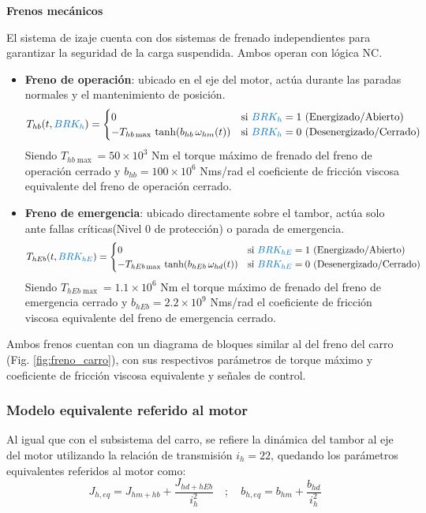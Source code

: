 \documentclass{article}
\begin{document}
\vspace{0.3cm}
\noindent\textbf{Frenos mecánicos}

El sistema de izaje cuenta con dos sistemas de frenado independientes para garantizar la seguridad de la
carga suspendida. Ambos operan con lógica NC.
\begin{itemize}
\item \textbf{Freno de operación}: ubicado en el eje del motor, actúa durante las paradas normales y el mantenimiento de posición. 
\begin{equation}
    T_{hb}(t,\textcolor{signalcolor}{BRK_{h}}) = 
    \begin{cases} 
        0 & \text{si } \textcolor{signalcolor}{BRK_h} = 1 \text{ (Energizado/Abierto)} \\
        -T_{hb\max} \, \tanh(b_{hb} \, \omega_{hm}(t)) & \text{si } \textcolor{signalcolor}{BRK_h} = 0 \text{ (Desenergizado/Cerrado)}
    \end{cases}
\end{equation}
Siendo $T_{hb\max} = 50 \times 10^3$ Nm el torque máximo de frenado del freno de operación cerrado y $b_{hb} = 100 \times 10^6$ Nms/rad el coeficiente de fricción viscosa equivalente del freno de operación cerrado.
\item \textbf{Freno de emergencia}: ubicado directamente sobre el tambor, actúa solo ante fallas críticas(Nivel 0 de protección) o parada de emergencia.
\begin{equation}
    T_{hEb}(t,\textcolor{signalcolor}{BRK_{hE}}) = 
    \begin{cases} 
        0 & \text{si } \textcolor{signalcolor}{BRK_{hE}} = 1 \text{ (Energizado/Abierto)} \\
        -T_{hEb\max} \, \tanh(b_{hEb} \, \omega_{hd}(t)) & \text{si } \textcolor{signalcolor}{BRK_{hE}} = 0 \text{ (Desenergizado/Cerrado)}
    \end{cases}
\end{equation}
Siendo $T_{hEb\max} = 1.1 \times 10^6$ Nm el torque máximo de frenado del freno de emergencia cerrado y $b_{hEb} = 2.2 \times 10^9$ Nms/rad el coeficiente de fricción viscosa equivalente del freno de emergencia cerrado.
\end{itemize}

Ambos frenos cuentan con un diagrama de bloques similar al del freno del carro (Fig. \ref{fig:freno_carro}), 
con sus respectivos parámetros de torque máximo y coeficiente de fricción viscosa equivalente y señales de control.
\subsubsection{Modelo equivalente referido al motor}
Al igual que con el subsistema del carro, se refiere la dinámica del tambor al eje del motor utilizando la relación de transmisión $i_h = 22$, quedando los parámetros 
equivalentes referidos al motor como:
\begin{equation}
    J_{h,eq} = J_{hm+hb} + \frac{J_{hd+hEb}}{i_h^2}  \quad ; \quad
    b_{h,eq} = b_{hm} + \frac{b_{hd}}{i_h^2}
\end{equation}
\end{document}
